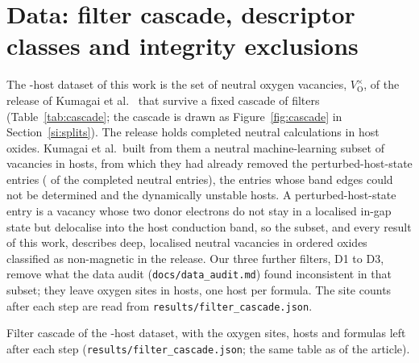 \section{Data: filter cascade, descriptor classes and integrity exclusions}
\label{si:data}

The \numFilterCascadeStepsFinalHosts{}-host dataset of this work is the set of neutral oxygen vacancies, $V_\mathrm{O}^{\times}$, of the release of
Kumagai et al.\ \citep{Kumagai2021insights} that survive a fixed cascade of filters (Table~\ref{tab:cascade}; the
cascade is drawn as Figure~\ref{fig:cascade} in Section~\ref{si:splits}). The release holds
\numFilterCascadeStepsReleaseSites{} completed neutral calculations in \numFilterCascadeStepsReleaseHosts{} host
oxides. Kumagai et al.\ built from them a neutral machine-learning subset of \numFilterCascadeStepsMlSubsetSites{}
vacancies in \numFilterCascadeStepsMlSubsetHosts{} hosts, from which they had already removed the
perturbed-host-state entries (\numScreeningAbsenceReleaseNeutralCompletedPhs{} of the completed neutral entries),
the entries whose band edges could not be determined and the dynamically unstable hosts. A perturbed-host-state
entry is a vacancy whose two donor electrons do not stay in a localised in-gap state but delocalise into the host
conduction band, so the subset, and every result of this work, describes deep, localised neutral vacancies in
ordered oxides classified as non-magnetic in the release. Our three further filters, D1 to D3, remove what the data audit
(\texttt{docs/data\_audit.md}) found inconsistent in that subset; they leave \numFilterCascadeStepsFinalSites{}
oxygen sites in \numFilterCascadeStepsFinalHosts{} hosts, one host per formula. The site counts after each
step are read from \texttt{results/filter\_cascade.json}.

\begin{table}[htbp]
\caption{Filter cascade of the \numFilterCascadeStepsFinalHosts{}-host dataset, with the oxygen sites, hosts and formulas left after each step
(\texttt{results/filter\_cascade.json}; the same table as \arttabcascade{} of the article).}
\label{tab:cascade}
\centering\small
\begin{adjustbox}{max width=\linewidth}

\end{adjustbox}
\end{table}

